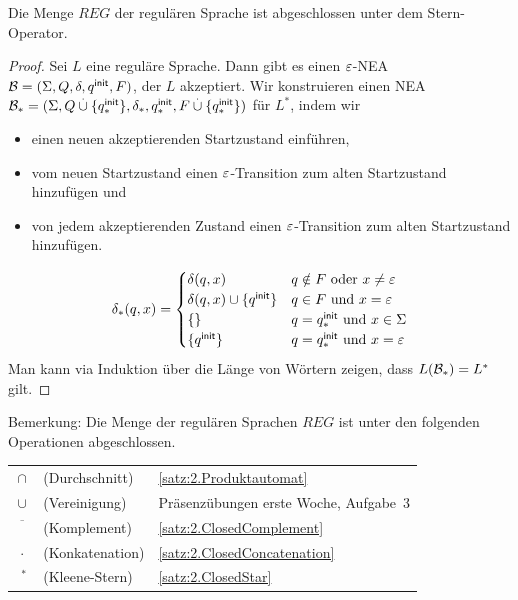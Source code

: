\begin{lemma}\label{satz:2.ClosedStar}
Die Menge $REG$ der regulären Sprache ist abgeschlossen unter dem Stern-Operator.
\end{lemma}

\begin{proof}
Sei $L$ eine reguläre Sprache. Dann gibt es einen $\varepsilon$-NEA $\mathcal{B}=(\Sigma, Q, \delta, q^\mathsf{init}, F)$, der $L$ akzeptiert. 
Wir konstruieren einen NEA $\mathcal{B}_*=(\Sigma, Q\overset.\cup\{q^\mathsf{init}_*\}, \delta_*, q^\mathsf{init}_*, F\overset.\cup\{q^\mathsf{init}_*\})$ für $L^*$, indem wir
\begin{itemize}
 \item einen neuen akzeptierenden Startzustand einführen,
 \item vom neuen Startzustand einen $\varepsilon$-Transition zum alten Startzustand hinzufügen und
 \item von jedem akzeptierenden Zustand einen $\varepsilon$-Transition zum alten Startzustand hinzufügen.
\end{itemize}
\[
                \delta_*(q,x) =
                        \begin{cases}
                                \delta(q,x) & q\notin F \text{ oder } x \neq \varepsilon\\
                                \delta(q,x)\cup\{q^\mathsf{init}\} & q\in F \text{ und } x = \varepsilon \\
                                \{\} & q=q^\mathsf{init}_* \text{ und } x \in\Sigma\\
                                \{q^\mathsf{init}\} & q=q^\mathsf{init}_* \text{ und } x = \varepsilon
                        \end{cases}
\]
Man kann via Induktion über die Länge von Wörtern zeigen, dass $L(\mathcal{B}_*)=L^*$ gilt.
\end{proof}

Bemerkung: Die Menge der regulären Sprachen $REG$ ist unter den folgenden Operationen abgeschlossen.

\begin{center}
\begin{tabular}{cl@{\quad}l}
 $\cap$ & (Durchschnitt) & \autoref{satz:2.Produktautomat}\\
 $\cup$ & (Vereinigung) & Präsenzübungen erste Woche, Aufgabe~3\\
 $\overline{\phantom{X}}$ & (Komplement) & \autoref{satz:2.ClosedComplement}\\
 $\cdot$ & (Konkatenation) & \autoref{satz:2.ClosedConcatenation}\\
 $\phantom{\cdot}^*$ & (Kleene-Stern) & \autoref{satz:2.ClosedStar} 
\end{tabular}
\end{center}



